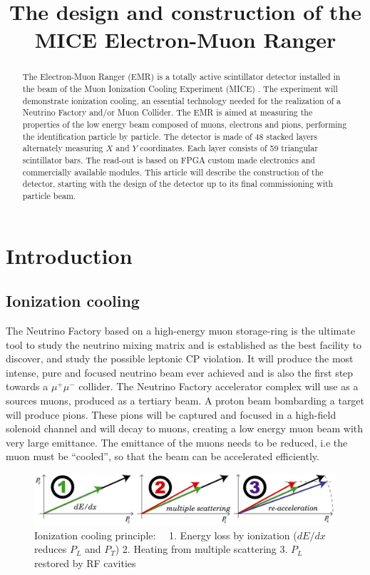 \documentclass[a4paper,11pt]{article}
\title{The design and construction of the MICE Electron-Muon Ranger}
\author{}
\begin{document}
\maketitle

\begin{abstract}
The Electron-Muon Ranger (EMR) is a totally active scintillator detector installed in the beam of the Muon Ionization
Cooling Experiment (MICE) \cite{MICEweb}. The experiment will demonstrate ionization cooling, an essential technology needed
for the realization of a Neutrino Factory and/or Muon Collider. The EMR is aimed at measuring the properties of the low
energy beam composed of muons, electrons and pions, performing the identification particle by particle. The detector is
made of 48 stacked layers alternately measuring $X$ and $Y$ coordinates. Each layer consists of 59 triangular scintillator
bars. The read-out is based on FPGA custom made electronics and commercially available modules. This article will describe
the construction of the detector, starting with the design of the detector up to its final commissioning with particle beam.
\end{abstract}

\section{Introduction}
\subsection{Ionization cooling}
The Neutrino Factory based on a high-energy muon storage-ring is the ultimate tool to study the neutrino mixing matrix
and is established as the best facility to discover, and study the possible leptonic CP violation. It will produce the
most intense, pure and focused neutrino beam ever achieved and is also the first step towards a $\mu^+ \mu^-$ collider.
The Neutrino Factory accelerator complex will use as a sources muons, produced as a tertiary beam. A proton beam bombarding
a target will produce pions. These pions will be captured and focused in a high-field solenoid channel and will decay
to muons, creating a low energy muon beam with very large emittance.  The emittance of the muons needs to be reduced,
i.e the muon must be “cooled”, so that the beam can be accelerated efficiently.

\begin{figure}[htb]
 \includegraphics[width=1.\linewidth]{./ICool.png}
 \caption{Ionization cooling principle: \ \ 1. Energy loss by ionization ($dE/dx$ reduces $P_L$ and $P_T$)
    2. Heating from multiple scattering
    3. $P_L$ restored by RF cavities    
   }
 \label{icool}     
\end{figure}
\end{document}

